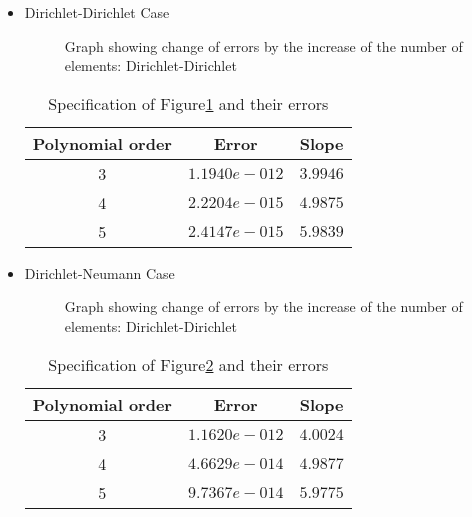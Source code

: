 \begin{itemize}

\item Dirichlet-Dirichlet Case
\begin{figure}[h]
\begin{center}
\caption{\label{sinDDhconv}Graph showing change of errors by the
increase of the number of elements: Dirichlet-Dirichlet}
\end{center}
\end{figure}

\begin{table}[h]
\centering \caption{\label{hconv1t} Specification of
                              Figure\ref{sinDDhconv} and their errors}
\begin{tabular}{|c|c|c|} \hline
Polynomial order&Error&Slope   \\ \hline \hline
    3&$1.1940e-012$ &$3.9946$ \\ \hline
    4&$2.2204e-015$ &$4.9875$ \\ \hline
    5&$2.4147e-015$ &$5.9839$ \\ \hline
\end{tabular}
\end{table}

\item Dirichlet-Neumann Case


\begin{figure}[h]
\begin{center}
\caption{\label{sinDNhconv}Graph showing change of errors by the
increase of the number of elements: Dirichlet-Dirichlet}
\end{center}
\end{figure}

\begin{table}[h]
\centering \caption{\label{hconv2t} Specification of
                              Figure\ref{sinDNhconv} and their errors}
\begin{tabular}{|c|c|c|} \hline
Polynomial order&Error&Slope   \\ \hline \hline
    3&$1.1620e-012$ &$4.0024$ \\ \hline
    4&$4.6629e-014$ &$4.9877$ \\ \hline
    5&$9.7367e-014$ &$5.9775$ \\ \hline
\end{tabular}
\end{table}


\end{itemize}



